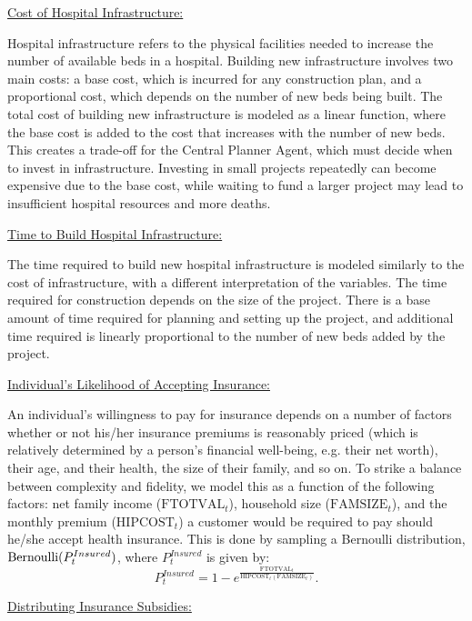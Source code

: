 \underline{Cost of Hospital Infrastructure:}

Hospital infrastructure refers to the physical facilities needed to increase the number of available beds in a hospital. Building new infrastructure involves two main costs: a base cost, which is incurred for any construction plan, and a proportional cost, which depends on the number of new beds being built. The total cost of building new infrastructure is modeled as a linear function, where the base cost is added to the cost that increases with the number of new beds. This creates a trade-off for the Central Planner Agent, which must decide when to invest in infrastructure. Investing in small projects repeatedly can become expensive due to the base cost, while waiting to fund a larger project may lead to insufficient hospital resources and more deaths.

\underline{Time to Build Hospital Infrastructure:}

The time required to build new hospital infrastructure is modeled similarly to the cost of infrastructure, with a different interpretation of the variables. The time required for construction depends on the size of the project. There is a base amount of time required for planning and setting up the project, and additional time required is linearly proportional to the number of new beds added by the project.

\underline{Individual's Likelihood of Accepting Insurance:}

An individual's willingness to pay for insurance depends on a number of factors whether or not his/her insurance premiums is reasonably priced (which is relatively determined by a person's financial well-being, e.g. their net worth), their age, and their health, the size of their family, and so on. To strike a balance between complexity and fidelity, we model this as a function of the following factors: net family income ($\text{FTOTVAL}_t$), household size ($\text{FAMSIZE}_t$), and the monthly premium ($\text{HIPCOST}_t$) a customer would be required to pay should he/she accept health insurance. This is done by sampling a Bernoulli distribution, ${\rm Bernoulli}(P^{Insured}_t)$, where $P^{Insured}_t$ is given by:
\begin{equation}
     P^{Insured}_t = 1-e^{\frac{\text{FTOTVAL}_t}{\text{HIPCOST}_t(\text{FAMSIZE}_t)}}.
\end{equation}

\underline{Distributing Insurance Subsidies:}

